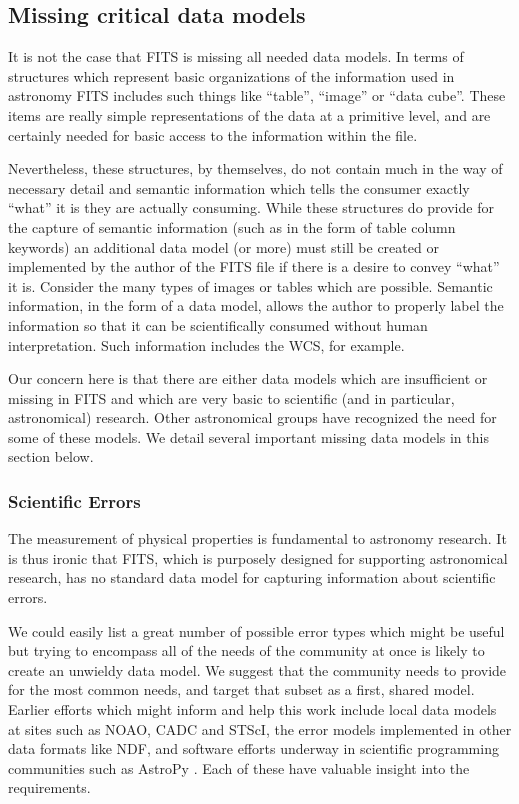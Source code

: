 \documentclass[final,authoryear,5p,times,twocolumn]{elsarticle}
\begin{document}
\subsection{Missing critical data models}


It is not the case that FITS is missing all needed data models. In
terms of structures which represent basic organizations of the
information used in astronomy FITS includes such things like ``table'',
``image'' or ``data cube''. These items are really simple representations
of the data at a primitive level, and are certainly needed for basic
access to the information within the file.


Nevertheless, these structures, by themselves, do not contain much in
the way of necessary detail and semantic information which tells the
consumer exactly ``what'' it is they are actually consuming. While these
structures do provide for the capture of semantic information (such as
in the form of table column keywords) an additional data model (or
more) must still be created or implemented by the author of the FITS
file if there is a desire to convey ``what'' it is. Consider the many
types of images or tables which are possible. Semantic information, in
the form of a data model, allows the author to properly label the
information so that it can be scientifically consumed without human
interpretation. Such information includes the WCS, for example.


Our concern here is that there are either data models which are
insufficient or missing in FITS and which are very basic to scientific
(and in particular, astronomical) research. Other astronomical groups
have recognized the need for some of these models. We detail
several important missing data models in this section below.

\subsubsection{Scientific Errors}


The measurement of physical properties is fundamental to astronomy
research. It is thus ironic that FITS, which is purposely designed for
supporting astronomical research, has no standard data model for
capturing information about scientific errors.


We could easily list a great number of possible error types which
might be useful but trying to encompass all of the needs of the
community at once is likely to create an unwieldy data model. We
suggest that the community needs to provide for the most common needs,
and target that subset as a first, shared model. Earlier efforts which
might inform and help this work include local data models at sites
such as NOAO, CADC \citep{2012ASPC..461..339D} and STScI, the error
models implemented in other data formats like NDF, and software
efforts underway in scientific programming communities such as AstroPy
\citep{2013A&A...558A..33A}. Each of these have valuable insight into
the requirements.
\end{document}
